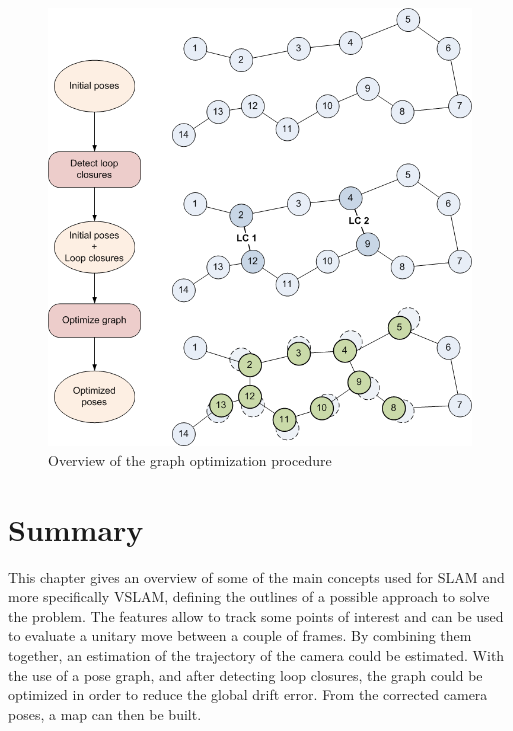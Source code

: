 \begin{figure}[H]
\centering
\includegraphics[width=1\textwidth]{figures/graph_overview}
\caption{Overview of the graph optimization procedure}
\label{fig:graph_overview}
\end{figure}

\clearpage
\section{Summary}

This chapter gives an overview of some of the main concepts used for \gls{SLAM} and more specifically \gls{VSLAM}, defining the outlines of a possible approach to solve the problem. The features allow to track some points of interest and can be used to evaluate a unitary move between a couple of frames. By combining them together, an estimation of the trajectory of the camera could be estimated. With the use of a pose graph, and after detecting loop closures, the graph could be optimized in order to reduce the global drift error. From the corrected camera poses, a map can then be built. 

